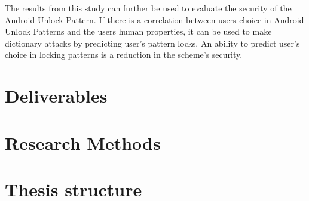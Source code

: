 	  The results from this study can further be used to evaluate the security of the Android Unlock Pattern. If there is a correlation between users choice in Android Unlock Patterns and the users human properties, it can be used to make dictionary attacks by predicting user's pattern locks. An ability to predict user's choice in locking patterns is a reduction in the scheme's security. 
	  
	\section{Deliverables} \label{sec:deliverables}
	\section{Research Methods} \label{sec:researchmethods}
	\section{Thesis structure} \label{sec:structure}
